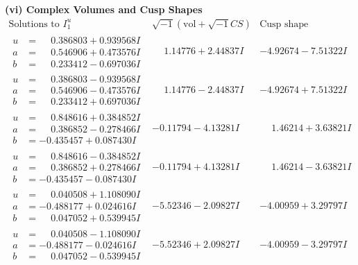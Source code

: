 \documentclass[1p]{elsarticle_modified}
\theoremstyle{definition}
\newcommand{\I}{\sqrt{-1}}
\begin{document}
\newpage\flushleft \textbf{(vi) Complex Volumes and Cusp Shapes}
$$\begin{array}{c|c|c}  
\text{Solutions to }I^u_{1}& \I (\text{vol} + \sqrt{-1}CS) & \text{Cusp shape}\\
 \hline 
\begin{aligned}
u &= \phantom{-}0.386803 + 0.939568 I \\
a &= \phantom{-}0.546906 + 0.473576 I \\
b &= \phantom{-}0.233412 - 0.697036 I\end{aligned}
 & \phantom{-}1.14776 + 2.44837 I & -4.92674 - 7.51322 I \\ \hline\begin{aligned}
u &= \phantom{-}0.386803 - 0.939568 I \\
a &= \phantom{-}0.546906 - 0.473576 I \\
b &= \phantom{-}0.233412 + 0.697036 I\end{aligned}
 & \phantom{-}1.14776 - 2.44837 I & -4.92674 + 7.51322 I \\ \hline\begin{aligned}
u &= \phantom{-}0.848616 + 0.384852 I \\
a &= \phantom{-}0.386852 - 0.278466 I \\
b &= -0.435457 + 0.087430 I\end{aligned}
 & -0.11794 - 4.13281 I & \phantom{-}1.46214 + 3.63821 I \\ \hline\begin{aligned}
u &= \phantom{-}0.848616 - 0.384852 I \\
a &= \phantom{-}0.386852 + 0.278466 I \\
b &= -0.435457 - 0.087430 I\end{aligned}
 & -0.11794 + 4.13281 I & \phantom{-}1.46214 - 3.63821 I \\ \hline\begin{aligned}
u &= \phantom{-}0.040508 + 1.108090 I \\
a &= -0.488177 + 0.024616 I \\
b &= \phantom{-}0.047052 + 0.539945 I\end{aligned}
 & -5.52346 - 2.09827 I & -4.00959 + 3.29797 I \\ \hline\begin{aligned}
u &= \phantom{-}0.040508 - 1.108090 I \\
a &= -0.488177 - 0.024616 I \\
b &= \phantom{-}0.047052 - 0.539945 I\end{aligned}
 & -5.52346 + 2.09827 I & -4.00959 - 3.29797 I \\ \hline\begin{aligned}

\end{aligned}
\end{array}$$
\end{document}
